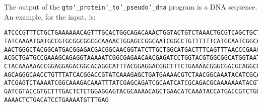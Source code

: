 The output of the \texttt{gto\char`_protein\char`_to\char`_pseudo\char`_dna} program is a DNA sequence.\\
An example, for the input, is:
\begin{lstlisting}
ATCCCGTTTCTGCTGAAAAAACAGTTTGCACTGGCAGACAAACTGGTACTGTCTAAACTGCGTCAGCTGCTGGGCGGCCG
TATCAAAATGATGCCGTGCGGCGGCGCAAAACTGGAGCCGGCAATCGGCCTGTTTTTTCATGCAATCGGCATCAACATCA
AACTGGGCTACGGCATGACGGAGACGACGGCAACGGTATCTTGCTGGCATGACTTTCAGTTTAACCCGAACTCTATCGGC
ACGCTGATGCCGAAAGCAGAGGTAAAAATCGGCGAGAACAACGAGATCCTGGTACGTGGCGGCATGGTAATGAAAGGCTA
CTACAAAAAACCGGAGGAGACGGCACAGGCATTTACGGAGGACGGCTTTCTGAAAACGGGCGACGCAGGCGAGTTTGACG
AGCAGGGCAACCTGTTTATCACGGACCGTATCAAAGAGCTGATGAAAACGTCTAACGGCAAATACATCGCACCGCAGTAC
ATCGAGTCTAAAATCGGCAAAGACAAATTTATCGAGCAGATCGCAATCATCGCAGACGCAAAAAAATACGTATCTGCACT
GATCGTACCGTGCTTTGACTCTCTGGAGGAGTACGCAAAACAGCTGAACATCAAATACCATGACCGTCTGGAGCTGCTGA
AAAACTCTGACATCCTGAAAATGTTTGAG
\end{lstlisting}

